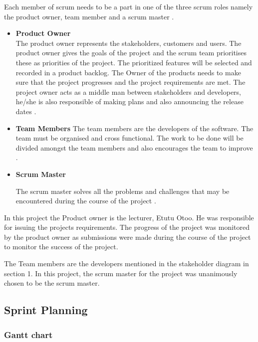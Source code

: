 \documentclass[10pt,onecolumn]{MainDocument}
\begin{document}
Each member of scrum needs to be a part in one of the three scrum roles namely the product owner, team member and a scrum master \cite{SoftwareEngineering}. 

\begin{itemize}
\item \textbf{Product Owner} \\
The product owner represents the stakeholders, customers and users. The product owner gives the goals of the project and the scrum team prioritises these as priorities of the project. The prioritized features will be selected and recorded in a product backlog. The Owner of the products needs to make sure that the project progresses and the project requirements are met. The project owner acts as a middle man between stakeholders and developers, he/she is also responsible of making plans and also announcing the release dates \cite{SoftwareEngineering}.    

\item \textbf{Team Members}
The team members are the developers of the software. The team must be organised and cross functional. The work to be done will be divided amongst the team members and also encourages the team to improve \cite{SoftwareEngineering}. 

    
\item \textbf{Scrum Master}

The scrum master solves all the problems and challenges that may be encountered during the course of the project \cite{SoftwareEngineering}. 
    
\end{itemize}  

In this project the Product owner is the lecturer, Etutu Otoo. He was responsible for issuing the projects requirements. The progress of the project was monitored by the product owner as submissions were made during the course of the project to monitor the success of the project.   

The Team members are the developers mentioned in the stakeholder diagram in section 1. In this project, the scrum master for the project was unanimously chosen to be the scrum master.  

\subsection{Sprint Planning } 

\subsubsection{Gantt chart}
\end{document}

